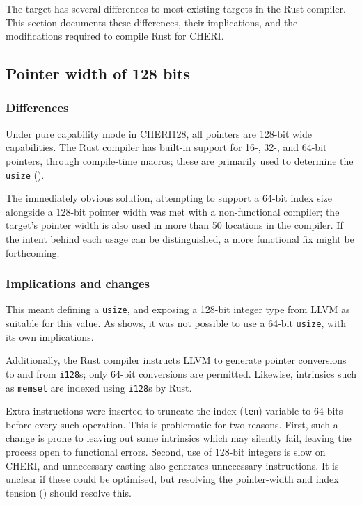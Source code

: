 \documentclass[dissertation.tex]{subfiles}
\begin{document}
The \cuf target has several differences to most existing targets in the
Rust compiler.
This section documents these differences, their implications, and the
modifications required to compile Rust for CHERI.


\subsection{Pointer width of 128 bits}
\label{sec:impl-width}

\subsubsection{Differences}
Under pure capability mode in CHERI128, all pointers are 128-bit wide
capabilities.
The Rust compiler has built-in support for 16-, 32-, and 64-bit
pointers, through compile-time macros; these are primarily used to
determine the \texttt{usize} ().

The immediately obvious solution, attempting to support a 64-bit index
size alongside a 128-bit pointer width was met with a non-functional
compiler; the target's pointer width is also used in more than 50
locations in the compiler.
If the intent behind each usage can be distinguished, a more functional
fix might be forthcoming.

\subsubsection{Implications and changes}
This meant defining a \texttt{usize}, and exposing a 128-bit integer
type from LLVM as suitable for this value.
As  shows, it was not possible to use a
64-bit \texttt{usize}, with its own implications.

Additionally, the Rust compiler instructs LLVM to generate
pointer conversions to and from \texttt{i128}s; only 64-bit conversions
are permitted.
Likewise, intrinsics such as \texttt{memset} are indexed using
\texttt{i128}s by Rust.

Extra instructions were inserted to truncate the index (\texttt{len})
variable to 64 bits before every such operation.
This is problematic for two reasons.
First, such a change is prone to leaving out some intrinsics which may
silently fail, leaving the process open to functional errors.
Second, use of 128-bit integers is slow on CHERI, and unnecessary
casting also generates unnecessary instructions.
It is unclear if these could be optimised, but resolving the
pointer-width and index tension () should
resolve this.
\end{document}
